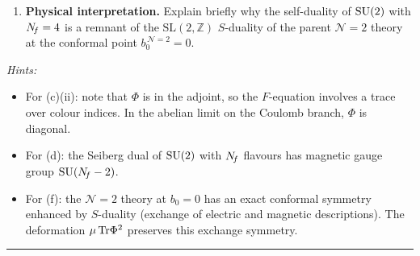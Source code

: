 \documentclass[11pt,a4paper]{article}
\begin{document}
\begin{enumerate}[label=(\alph*)]
  \item \textbf{Physical interpretation.}  Explain briefly why the
    self-duality of $\mathrm{SU}(2)$ with $N_{\!f} = 4$ is a remnant of the
    $\mathrm{SL}(2,\mathbb{Z})$ $S$-duality of the parent
    $\mathcal{N}=2$ theory at the conformal point $b_0^{\,\mathcal{N}=2}
    = 0$.
\end{enumerate}

\medskip

\noindent\textit{Hints:}
\begin{itemize}
  \item For (c)(ii): note that $\Phi$ is in the adjoint, so the
    $F$-equation involves a trace over colour indices.  In the abelian
    limit on the Coulomb branch, $\Phi$ is diagonal.
  \item For (d): the Seiberg dual of $\mathrm{SU}(2)$ with $N_{\!f}$ flavours has
    magnetic gauge group $\mathrm{SU}(N_{\!f} - 2)$.
  \item For (f): the $\mathcal{N}=2$ theory at $b_0 = 0$ has an exact
    conformal symmetry enhanced by $S$-duality (exchange of electric and
    magnetic descriptions).  The deformation $\mu\,\mathrm{Tr}\Phi^2$ preserves
    this exchange symmetry.
\end{itemize}

\bigskip
\hrule
\bigskip
\end{document}

